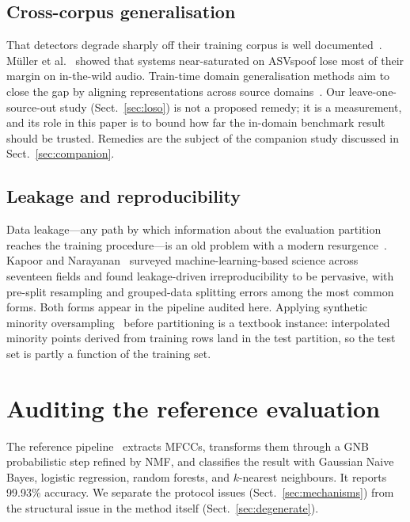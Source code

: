 \documentclass[sn-mathphys-num,pdflatex]{sn-jnl}
\begin{document}
\subsection{Cross-corpus generalisation}
That detectors degrade sharply off their training corpus is
well documented~\cite{generalization2020,itw,asdg}. M\"uller et
al.~\cite{itw} showed that systems near-saturated on ASVspoof lose most of their
margin on in-the-wild audio. Train-time domain generalisation methods aim to
close the gap by aligning representations across source
domains~\cite{asdg}. Our leave-one-source-out study
(Sect.~\ref{sec:loso}) is not a proposed remedy; it is a measurement, and its
role in this paper is to bound how far the in-domain benchmark result should be
trusted. Remedies are the subject of the companion study discussed in
Sect.~\ref{sec:companion}.

\subsection{Leakage and reproducibility}
Data leakage---any path by which information about the evaluation partition
reaches the training procedure---is an old problem with a modern
resurgence~\cite{leakage}. Kapoor and Narayanan~\cite{kapoor} surveyed
machine-learning-based science across seventeen fields and found leakage-driven
irreproducibility to be pervasive, with pre-split resampling and grouped-data
splitting errors among the most common forms. Both forms appear in the pipeline
audited here. Applying synthetic minority oversampling~\cite{smote} before
partitioning is a textbook instance: interpolated minority points derived from
training rows land in the test partition, so the test set is partly a function
of the training set.

\section{Auditing the reference evaluation}\label{sec:audit}

The reference pipeline~\cite{unmasking} extracts MFCCs, transforms them through
a GNB probabilistic step refined by NMF, and classifies the result with Gaussian
Naive Bayes, logistic regression, random forests, and $k$-nearest neighbours. It
reports 99.93\% accuracy. We separate the protocol issues
(Sect.~\ref{sec:mechanisms}) from the structural issue in the method itself
(Sect.~\ref{sec:degenerate}).
\end{document}
